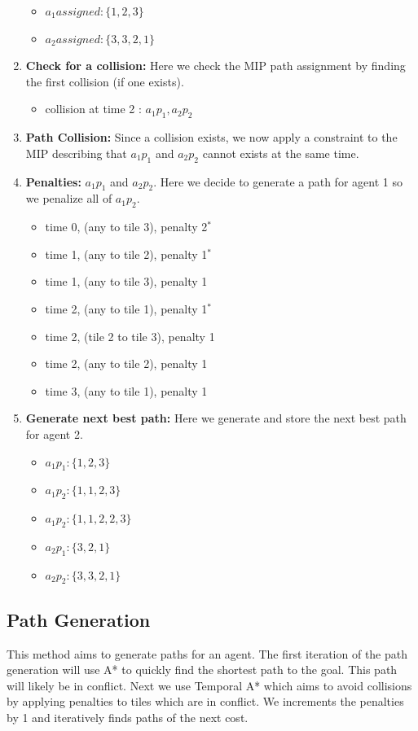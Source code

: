 \documentclass[a4paper,11pt]{article}
\begin{document}
\begin{enumerate}
\begin{itemize}
		\item $a_1assigned: \{1, 2, 3\}$
		\item $a_2assigned: \{3, 3, 2, 1\}$
	\end{itemize}
	\item \textbf{Check for a collision:} Here we check the MIP path assignment by finding the first collision (if one exists). 
	\begin{itemize}
		\item collision at time 2 : $a_1p_1, a_2p_2$
	\end{itemize}
	\item \textbf{Path Collision:} Since a collision exists, we now apply a constraint to the MIP describing that $a_1p_1$ and $a_2p_2$ cannot exists at the same time.
	\item \textbf{Penalties:} $a_1p_1$ and $a_2p_2$. Here we decide to generate a path for agent 1 so we penalize all of $a_1p_2$.
	\begin{itemize}
		\item time 0, (any to tile 3), penalty 2$^*$
		\item time 1, (any to tile 2), penalty 1$^*$
		\item time 1, (any to tile 3), penalty 1
		\item time 2, (any to tile 1), penalty 1$^*$
		\item time 2, (tile 2 to tile 3), penalty 1
		\item time 2, (any to tile 2), penalty 1
		\item time 3, (any to tile 1), penalty 1
	\end{itemize}
	\item \textbf{Generate next best path:} Here we generate and store the next best path for agent 2.
	\begin{itemize}
		\item $a_1p_1: \{1, 2, 3\}$
		\item $a_1p_2: \{1, 1, 2, 3\}$
		\item $a_1p_2: \{1, 1, 2, 2, 3\}$
		\item $a_2p_1: \{3, 2, 1\}$
		\item $a_2p_2: \{3, 3, 2, 1\}$
	\end{itemize}
\end{enumerate}


\subsection{Path Generation} \label{sec:generating-paths}
This method aims to generate paths for an agent. The first iteration of the path generation will use A* to quickly find the shortest path to the goal. This path will likely be in conflict. Next we use Temporal A* which aims to avoid collisions by applying penalties to tiles which are in conflict. We increments the penalties by 1 and iteratively finds paths of the next cost. 
\end{document}
